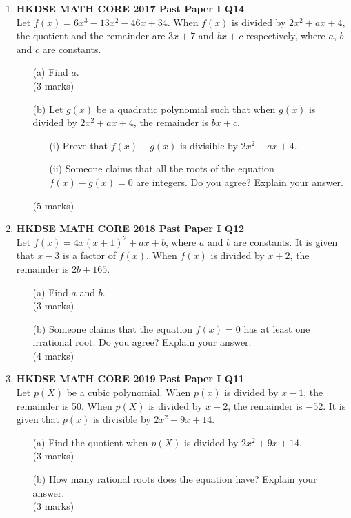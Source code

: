 \documentclass[12pt]{article}
\begin{document}
\begin{enumerate}
	\item \textbf{HKDSE MATH CORE 2017 Past Paper I Q14}\\
	Let $f(x) = 6x^3 - 13x^2 - 46x + 34$. When $f(x)$ is divided by $2x^2 + ax + 4$, the quotient and the remainder are $3x + 7$ and $bx + c$ respectively, where $a$, $b$ and $c$ are constants.
	\begin{enumerate}
		\item[(a)] Find $a$. \\(3 marks)
		\item[(b)] Let $g(x)$ be a quadratic polynomial such that when $g(x)$ is divided by $2x^2 + ax + 4$, the remainder is $bx + c$.
		\begin{enumerate}
			\item[(i)] Prove that  $f(x) - g(x)$ is divisible by $2x^2 + ax + 4$.
			\item[(ii)] Someone claims that all the roots of the equation  $f(x) - g(x) = 0$ are integers. Do you agree? Explain your answer.
		\end{enumerate}
		(5 marks)
	\end{enumerate}

	\item \textbf{HKDSE MATH CORE 2018 Past Paper I Q12}\\
	Let $f(x) = 4x(x+1)^2 + ax + b$, where $a$ and $b$ are constants. It is given that $x - 3$ is a factor of $f(x)$. When $f(x)$ is divided by $x + 2$, the remainder is $2b + 165$.
	\begin{enumerate}
		\item[(a)] Find $a$ and $b$. \\(3 marks)
		\item[(b)] Someone claims that the equation $f(x) = 0$ has at least one irrational root. Do you agree? Explain your answer. \\(4 marks)
	\end{enumerate}

	\item \textbf{HKDSE MATH CORE 2019 Past Paper I Q11}\\
	Let $p(X)$ be a cubic polynomial. When $p(x)$ is divided by $x - 1$, the remainder is 50. When $p(X)$ is divided by $x + 2$, the remainder is $-52$. It is given that $p(x)$ is divisible by $2x^2 + 9x + 14$.
	\begin{enumerate}
		\item[(a)] Find the quotient when $p(X)$ is divided by $2x^2 + 9x + 14$. \\(3 marks)
		\item[(b)] How many rational roots does the equation   have? Explain your answer. \\(3 marks)
	\end{enumerate}


\end{enumerate}
\end{document}
